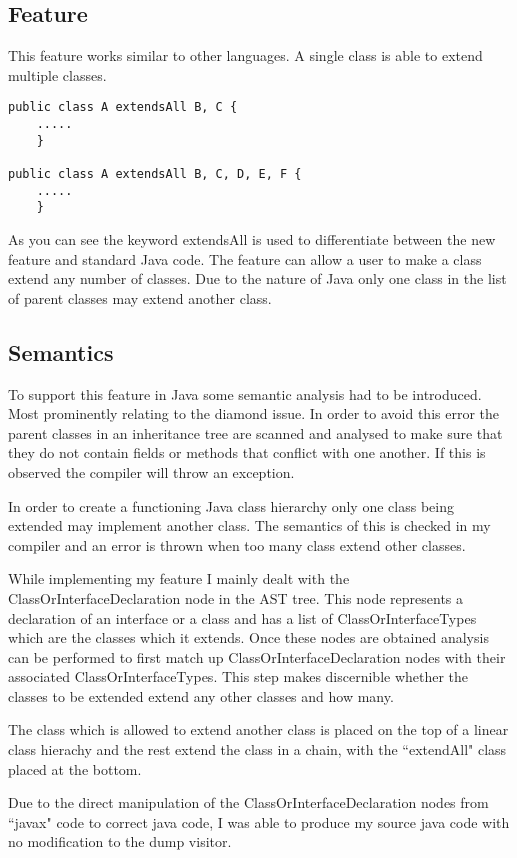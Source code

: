 \documentclass[twocolumn]{article} 	%
\begin{document}
\subsection{Feature}
This feature works similar to other languages. A single class is able to extend multiple classes. 
\begin{lstlisting}
public class A extendsAll B, C {	
	.....
	}
	
public class A extendsAll B, C, D, E, F {
	.....
	}	
\end{lstlisting}
As you can see the keyword extendsAll is used to differentiate between the new feature and standard Java code. The feature can allow a user to make a class extend any number of classes. Due to the nature of Java only one class in the list of parent classes may extend another class. %

\subsection{Semantics}
To support this feature in Java some semantic analysis had to be introduced. Most prominently relating to the diamond issue. In order to avoid this error the parent classes in an inheritance tree are scanned and analysed to make sure that they do not contain fields or methods that conflict with one another. If this is observed the compiler will throw an exception.

In order to create a functioning Java class hierarchy only one class being extended may implement another class. The semantics of this is checked in my compiler and an error is thrown when too many class extend other classes.

While implementing my feature I mainly dealt with the ClassOrInterfaceDeclaration node in the AST tree. This node represents a declaration of an interface or a class and has a list of ClassOrInterfaceTypes which are the classes which it extends. Once these nodes are obtained analysis can be performed to first match up ClassOrInterfaceDeclaration nodes with their associated ClassOrInterfaceTypes. This step makes discernible whether the classes to be extended extend any other classes and how many.

The class which is allowed to extend another class is placed on the top of a linear class hierachy and the rest extend the class in a chain, with the ``extendAll" class placed at the bottom.

Due to the direct manipulation of the ClassOrInterfaceDeclaration nodes from ``javax" code to  correct java code, I was able to produce my source java code with no modification to the dump visitor.
\end{document}
